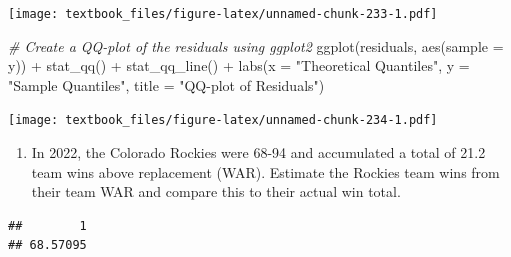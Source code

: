 \documentclass[
  11pt,
]{book}
\newenvironment{Shaded}{\begin{snugshade}}{\end{snugshade}}
\newcommand{\AttributeTok}[1]{\textcolor[rgb]{0.77,0.63,0.00}{#1}}
\newcommand{\CommentTok}[1]{\textcolor[rgb]{0.56,0.35,0.01}{\textit{#1}}}
\newcommand{\FloatTok}[1]{\textcolor[rgb]{0.00,0.00,0.81}{#1}}
\newcommand{\FunctionTok}[1]{\textcolor[rgb]{0.00,0.00,0.00}{#1}}
\newcommand{\NormalTok}[1]{#1}
\newcommand{\OtherTok}[1]{\textcolor[rgb]{0.56,0.35,0.01}{#1}}
\newcommand{\SpecialCharTok}[1]{\textcolor[rgb]{0.00,0.00,0.00}{#1}}
\newcommand{\StringTok}[1]{\textcolor[rgb]{0.31,0.60,0.02}{#1}}
\providecommand{\tightlist}{%
  \setlength{\itemsep}{0pt}\setlength{\parskip}{0pt}}
\theoremstyle{definition}
\theoremstyle{definition}
\theoremstyle{definition}
\theoremstyle{definition}
\theoremstyle{remark}
\begin{document}
\texttt{[image: textbook\_files/figure-latex/unnamed-chunk-233-1.pdf]}

\newpage

\begin{Shaded}
\begin{Highlighting}[]
\CommentTok{\# Create a QQ{-}plot of the residuals using ggplot2}
\FunctionTok{ggplot}\NormalTok{(residuals, }\FunctionTok{aes}\NormalTok{(}\AttributeTok{sample =}\NormalTok{ y)) }\SpecialCharTok{+}
  \FunctionTok{stat\_qq}\NormalTok{() }\SpecialCharTok{+}
  \FunctionTok{stat\_qq\_line}\NormalTok{() }\SpecialCharTok{+}
  \FunctionTok{labs}\NormalTok{(}\AttributeTok{x =} \StringTok{"Theoretical Quantiles"}\NormalTok{, }\AttributeTok{y =} \StringTok{"Sample Quantiles"}\NormalTok{, }\AttributeTok{title =} \StringTok{"QQ{-}plot of Residuals"}\NormalTok{)}
\end{Highlighting}
\end{Shaded}

\texttt{[image: textbook\_files/figure-latex/unnamed-chunk-234-1.pdf]}

\newpage

\begin{enumerate}
\def\labelenumi{(\alph{enumi})}
\setcounter{enumi}{4}
\tightlist
\item
  In 2022, the Colorado Rockies were 68-94 and accumulated a total of 21.2 team wins above replacement (WAR). Estimate the Rockies team wins from their team WAR and compare this to their actual win total.
\end{enumerate}

\begin{Shaded}
\end{Shaded}

\begin{verbatim}
##        1 
## 68.57095
\end{verbatim}
\end{document}
